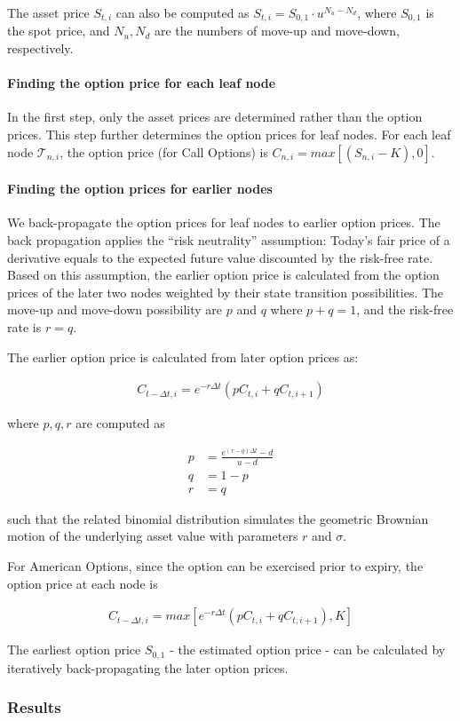 The asset price $S_{t, i}$ can also be computed as $S_{t, i} = S_{0, 1} \cdot u^{N_u - N_d}$, where $S_{0, 1}$ is the spot price, and $N_u, N_d$ are the numbers of move-up and move-down, respectively.

\paragraph{Finding the option price for each leaf node}
In the first step, only the asset prices are determined rather than the option prices.
This step further determines the option prices for leaf nodes.
For each leaf node $\mathcal{T}_{n, i}$, the option price (for Call Options) is $C_{n, i} = max[(S_{n, i} - K), 0]$.

\paragraph{Finding the option prices for earlier nodes}
We back-propagate the option prices for leaf nodes to earlier option prices.
The back propagation applies the ``risk neutrality'' assumption:
Today's fair price of a derivative equals to the expected future value discounted by the risk-free rate. %
Based on this assumption, the earlier option price is calculated from the option prices of the later two nodes weighted by their state transition possibilities.
The move-up and move-down possibility are $p$ and $q$ where $p + q = 1$, and the risk-free rate is $r = q$.

The earlier option price is calculated from later option prices as:

\begin{align} 
C_{t - \Delta t, i} = e^{-r \Delta t} (p C_{t, i} + q C_{t, i+1})
\end{align}

where $p, q, r$ are computed as

\begin{align} 
p &= \frac{e^{(r-q)\Delta t} - d}{u - d}\\
q &= 1 - p\\
r &= q
\end{align}

such that the related binomial distribution simulates the geometric Brownian motion of the underlying asset value with parameters $r$ and $\sigma$.

For American Options, since the option can be exercised prior to expiry, the option price at each node is

\begin{align}
C_{t - \Delta t, i} = max[e^{-r \Delta t} (p C_{t, i} + q C_{t, i+1}), K]
\end{align}

The earliest option price $S_{0, 1}$ - the estimated option price - can be calculated by iteratively back-propagating the later option prices. 

\subsubsection{Results}